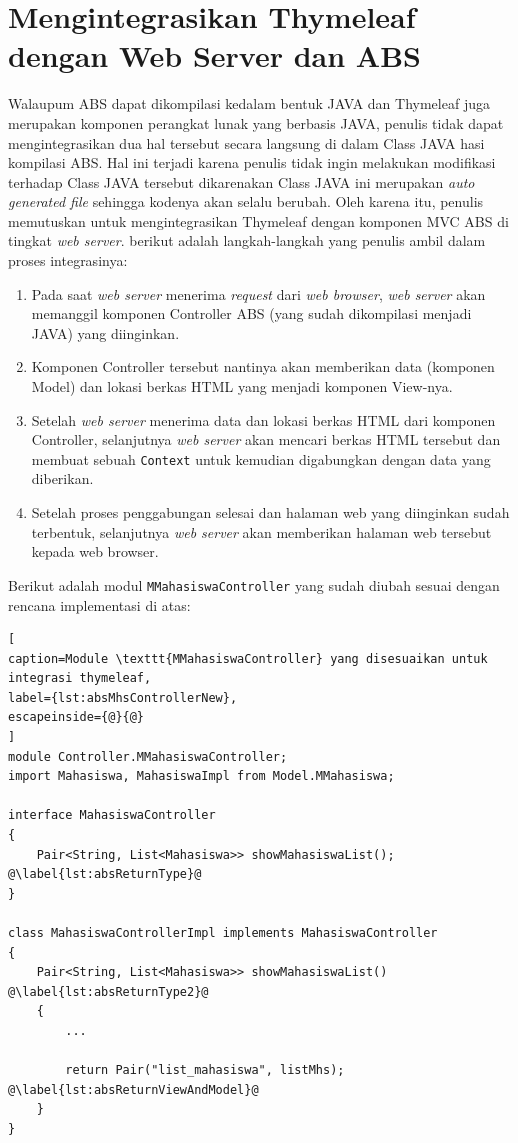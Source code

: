 \section{Mengintegrasikan Thymeleaf dengan Web Server dan ABS}

Walaupum ABS dapat dikompilasi kedalam bentuk JAVA dan Thymeleaf juga merupakan komponen perangkat lunak yang berbasis JAVA, penulis tidak dapat mengintegrasikan dua hal tersebut secara langsung di dalam Class JAVA hasi kompilasi ABS. Hal ini terjadi karena penulis tidak ingin melakukan modifikasi terhadap Class JAVA tersebut dikarenakan Class JAVA ini merupakan \textit{auto generated file} sehingga kodenya akan selalu berubah. Oleh karena itu, penulis memutuskan untuk mengintegrasikan Thymeleaf dengan komponen MVC ABS di tingkat \textit{web server}. berikut adalah langkah-langkah yang penulis ambil dalam proses integrasinya:

\begin{enumerate}
    \item Pada saat \textit{web server} menerima \textit{request} dari \textit{web browser}, \textit{web server} akan memanggil komponen Controller ABS (yang sudah dikompilasi menjadi JAVA) yang diinginkan.
    \item Komponen Controller tersebut nantinya akan memberikan data (komponen Model) dan lokasi berkas HTML yang menjadi komponen View-nya.
    \item Setelah \textit{web server} menerima data dan lokasi berkas HTML dari komponen Controller, selanjutnya \textit{web server} akan mencari berkas HTML tersebut dan membuat sebuah \texttt{Context} untuk kemudian digabungkan dengan data yang diberikan.
    \item Setelah proses penggabungan selesai dan halaman web yang diinginkan sudah terbentuk, selanjutnya \textit{web server} akan memberikan halaman web tersebut kepada web browser.
\end{enumerate}

Berikut adalah modul \texttt{MMahasiswaController} yang sudah diubah sesuai dengan rencana implementasi di atas:

\begin{lstlisting}[
caption=Module \texttt{MMahasiswaController} yang disesuaikan untuk integrasi thymeleaf,
label={lst:absMhsControllerNew},
escapeinside={@}{@}
]
module Controller.MMahasiswaController;
import Mahasiswa, MahasiswaImpl from Model.MMahasiswa;

interface MahasiswaController
{
	Pair<String, List<Mahasiswa>> showMahasiswaList(); @\label{lst:absReturnType}@
}

class MahasiswaControllerImpl implements MahasiswaController
{
	Pair<String, List<Mahasiswa>> showMahasiswaList() @\label{lst:absReturnType2}@
	{
		...
		
		return Pair("list_mahasiswa", listMhs); @\label{lst:absReturnViewAndModel}@
	}
}
\end{lstlisting}

